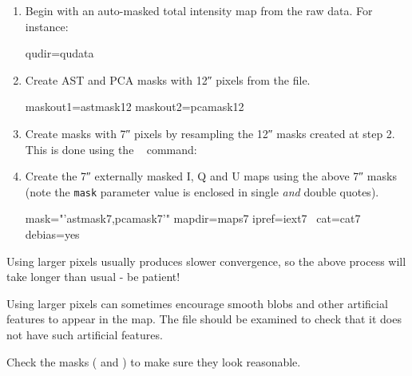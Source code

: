 \begin{enumerate}
\item Begin with an auto-masked total intensity map from the raw
  data. For instance:

\begin{terminalv}
                    qudir=qudata
\end{terminalv}


\item Create AST and PCA masks with 12\si{\arcsecond} pixels from the
   file.


\begin{terminalv}
                   maskout1=astmask12 maskout2=pcamask12
\end{terminalv}

\item Create masks with 7\si{\arcsecond} pixels by resampling the
  12\si{\arcsecond} masks created at step 2. This is done using the
  \Kappa\  command:

\begin{terminalv}
\end{terminalv}

\item Create the 7\si{\arcsecond} externally masked I, Q and U maps
  using the above 7\si{\arcsecond} masks (note the \texttt{mask}
  parameter value is enclosed in single \emph{and} double quotes).

\begin{terminalv}
                  mask="'astmask7,pcamask7'" mapdir=maps7 ipref=iext7  \
                  cat=cat7 debias=yes
\end{terminalv}
\end{enumerate}

\begin{tip}
  Using larger pixels usually produces slower convergence, so the
  above process will take longer than usual - be patient!

  Using larger pixels can sometimes encourage smooth blobs and other
  artificial features to appear in the map. The \file{iauto12.sdf} file
  should be examined to check that it does not have such artificial
  features.

  Check the masks ( and ) to make sure they
  look reasonable.
\end{tip}

